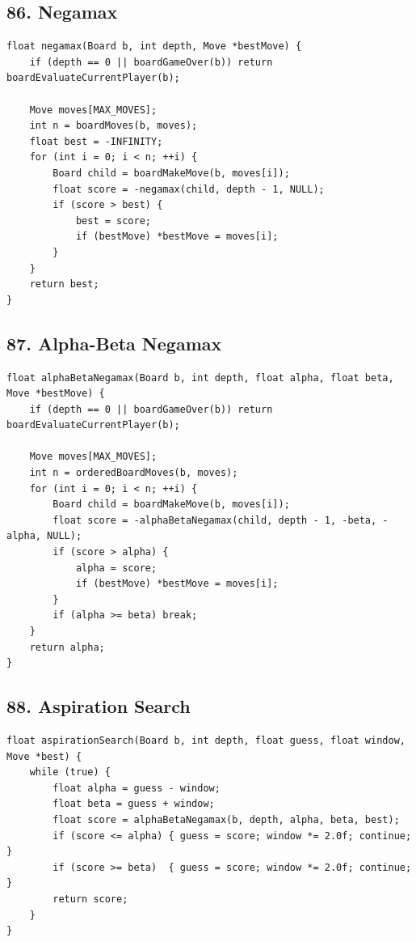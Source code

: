 \documentclass[10pt,letterpaper]{article}
\begin{document}
\subsection*{86. Negamax}
{}

\begin{verbatim}
float negamax(Board b, int depth, Move *bestMove) {
    if (depth == 0 || boardGameOver(b)) return boardEvaluateCurrentPlayer(b);

    Move moves[MAX_MOVES];
    int n = boardMoves(b, moves);
    float best = -INFINITY;
    for (int i = 0; i < n; ++i) {
        Board child = boardMakeMove(b, moves[i]);
        float score = -negamax(child, depth - 1, NULL);
        if (score > best) {
            best = score;
            if (bestMove) *bestMove = moves[i];
        }
    }
    return best;
}
\end{verbatim}

\subsection*{87. Alpha-Beta Negamax}
{}

\begin{verbatim}
float alphaBetaNegamax(Board b, int depth, float alpha, float beta, Move *bestMove) {
    if (depth == 0 || boardGameOver(b)) return boardEvaluateCurrentPlayer(b);

    Move moves[MAX_MOVES];
    int n = orderedBoardMoves(b, moves);
    for (int i = 0; i < n; ++i) {
        Board child = boardMakeMove(b, moves[i]);
        float score = -alphaBetaNegamax(child, depth - 1, -beta, -alpha, NULL);
        if (score > alpha) {
            alpha = score;
            if (bestMove) *bestMove = moves[i];
        }
        if (alpha >= beta) break;
    }
    return alpha;
}
\end{verbatim}

\subsection*{88. Aspiration Search}
{}

\begin{verbatim}
float aspirationSearch(Board b, int depth, float guess, float window, Move *best) {
    while (true) {
        float alpha = guess - window;
        float beta = guess + window;
        float score = alphaBetaNegamax(b, depth, alpha, beta, best);
        if (score <= alpha) { guess = score; window *= 2.0f; continue; }
        if (score >= beta)  { guess = score; window *= 2.0f; continue; }
        return score;
    }
}
\end{verbatim}
\end{document}

